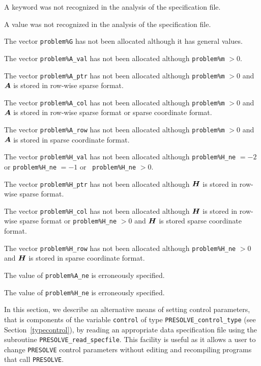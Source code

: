 \documentclass{galahad}
\newcommand{\packagename}{PRESOLVE}
\begin{document}
\begin{description}
 A keyword was not recognized in the analysis of the specification
file.

 A value was not recognized in the analysis of the specification file.

 The vector {\tt problem\%G} has not been allocated although it
has general values.

 The vector {\tt problem\%A\_val} has not been allocated although
{\tt problem\%m} $> 0$.

 The vector {\tt problem\%A\_ptr} has not been allocated although
{\tt problem\%m} $> 0$ and ${\bm{A}}$ is stored in row-wise sparse format.

 The vector {\tt problem\%A\_col} has not been allocated although
{\tt problem\%m} $> 0$ and ${\bm{A}}$ is stored in row-wise sparse format
or sparse coordinate format.

 The vector {\tt problem\%A\_row} has not been allocated although
{\tt problem\%m} $> 0$ and ${\bm{A}}$ is stored in sparse coordinate format.

 The vector {\tt problem\%H\_val} has not been allocated although
{\tt problem\%H\_ne} $= -2$ or {\tt problem\%H\_ne} $= -1$ or {\tt
problem\%H\_ne} $> 0$.

 The vector {\tt problem\%H\_ptr} has not been allocated although
${\bm{H}}$ is stored in row-wise sparse format.

 The vector {\tt problem\%H\_col} has not been allocated although
${\bm{H}}$ is stored in row-wise sparse format or {\tt problem\%H\_ne} $> 0$ and
${\bm{H}}$ is stored sparse coordinate format.

 The vector {\tt problem\%H\_row} has not been allocated although
{\tt problem\%H\_ne} $> 0$ and ${\bm{H}}$ is stored in sparse coordinate format.

 The value of {\tt problem\%A\_ne} is erroneously specified.

 The value of {\tt problem\%H\_ne} is erroneously specified.

\end{description}


\galfeatures
\noindent In this section, we describe an alternative means of setting
control parameters, that is components of the variable {\tt control} of type
{\tt \packagename\_control\_type}
(see Section~\ref{typecontrol}),
by reading an appropriate data specification file using the
subroutine {\tt \packagename\_read\_specfile}. This facility
is useful as it allows a user to change  {\tt \packagename} control parameters
without editing and recompiling programs that call {\tt \packagename}.
\end{document}
